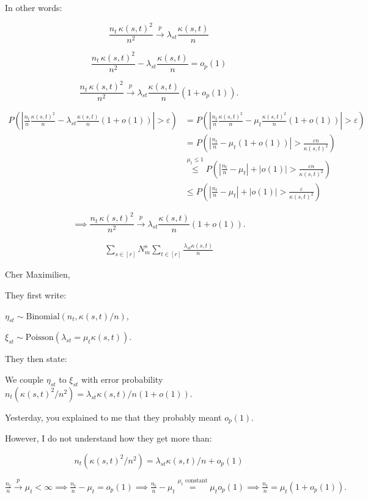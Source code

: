 \documentclass[
  letterpaper,
  DIV=11,
  numbers=noendperiod]{scrartcl}
\begin{document}
In other words:

\[
\frac{n_t \, \kappa(s,t)^2}{n^2}  \xrightarrow{p} \lambda_{st} \frac{\kappa(s,t)}{n}
\]

\[
\frac{n_t \, \kappa(s,t)^2}{n^2}  - \lambda_{st} \frac{\kappa(s,t)}{n} = o_p(1)
\]

\[
\frac{n_t \, \kappa(s,t)^2}{n^2}  \xrightarrow{p} \lambda_{st} \frac{\kappa(s,t)}{n} (1 + o_p(1)).
\]

\[
\begin{align*}
P\left( \left|\frac{n_t}{n} \frac{\kappa(s,t)^2}{n} - \lambda_{st} \frac{\kappa(s,t)}{n} (1 + o(1))\right| > \varepsilon \right) &= P\left( \left|\frac{n_t}{n} \frac{\kappa(s,t)^2}{n} - \mu_{t} \frac{\kappa(s,t)^2}{n} (1 + o(1)) \right| > \varepsilon \right) \\
&= P\left( \left|\frac{n_t}{n} - \mu_{t} (1 + o(1))\right| > \frac{\varepsilon n}{\kappa(s,t)^2} \right) \\
&\stackrel{\mu_t \leq1}{\leq} P\left( \left|\frac{n_t}{n} - \mu_{t} \right| + |o(1)| > \frac{\varepsilon n}{\kappa(s,t)^2} \right) \\
&\leq P\left( \left|\frac{n_t}{n} - \mu_{t}\right| + |o(1)| > \frac{\varepsilon}{\kappa(s,t)^2} \right)
\end{align*}
\]

\[
\implies\frac{n_t \, \kappa(s,t)^2}{n^2}  \xrightarrow{p} \lambda_{st} \frac{\kappa(s,t)}{n} (1 + o(1)).
\]

\[
\begin{align*}
\sum_{s\in[r]} N_m^s \sum_{t\in[r]} \frac{\lambda_{st}\kappa(s,t)}{n}
\end{align*} 
\]

Cher Maximilien,

They first write:

\(\eta_{st} \sim \text{Binomial}(n_t, \kappa(s,t) /n)\),

\(\xi_{st} \sim \text{Poisson}(\lambda_{st} = \mu_t\kappa(s,t))\).

They then state:

We couple \(\eta_{st}\) to \(\xi_{st}\) with error probability
\(n_t (\kappa(s,t)^2 / n^2) = \lambda_{st} \kappa(s,t) / n(1+o(1))\).

Yesterday, you explained to me that they probably meant \(o_p(1).\)

However, I do not understand how they get more than:

\[
n_t (\kappa(s,t)^2 / n^2) =\lambda_{st} \kappa(s,t) / n + o_p(1)
\]

\(\frac{n_t}{n} \xrightarrow{p} \mu_t < \infty \implies \frac{n_t}{n} - \mu_t = o_p(1) \implies \frac{n_t}{n} - \mu_t \stackrel{\mu_t \text{ constant}}{=} \mu_t o_p(1) \implies \frac{n_t}{n} = \mu_t(1 +  o_p(1)).\)
\end{document}

